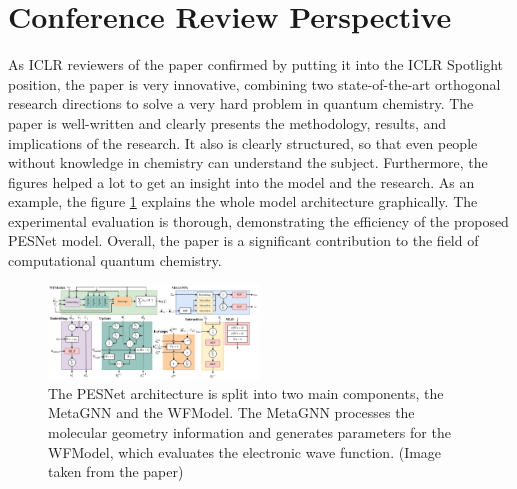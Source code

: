 \documentclass{article}
\begin{document}
\section{Conference Review Perspective}
As ICLR reviewers of the paper confirmed by putting it into the ICLR Spotlight position, the paper is very innovative, combining two state-of-the-art orthogonal research directions to solve a very hard problem in quantum chemistry. The paper is well-written and clearly presents the methodology, results, and implications of the research. It also is clearly structured, so that even people without knowledge in chemistry can understand the subject. Furthermore, the figures helped a lot to get an insight into the model and the research. As an example, the figure \ref{fig:architecture} explains the whole model architecture graphically. The experimental evaluation is thorough, demonstrating the efficiency of the proposed PESNet model. Overall, the paper is a significant contribution to the field of computational quantum chemistry.

\begin{figure}[h]
    \centering
    \includegraphics[width=0.5\textwidth]{architecture_.png}
    \caption{The PESNet architecture is split into two main components, the MetaGNN and the WFModel. The MetaGNN processes the molecular geometry information and generates parameters for the WFModel, which evaluates the electronic wave function. (Image taken from the paper)}
    \label{fig:architecture}
\end{figure}
\end{document}
